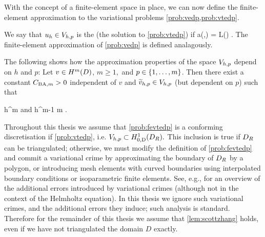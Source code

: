 

    With the concept of a finite-element space in place, we can now define the finite-element approximation to the variational problems \cref{prob:vedp,prob:vtedp}.

    \label{prob:fevtedp}
    We say that $u_{h} \in V_{h,p}$ is the  (the solution to \cref{prob:vtedp}) if
    \beqs
    a(\uh,\vh) = L(\vh) \tforall \vh \in \Vhp.
    \eeqs
    The finite-element approximation of \cref{prob:vedp} is defined analagously.
    \eprob

    The following  shows how the approximation properties of the space $V_{h,p}$ depend on $h$ and $p$:
    \label{lem:scottzhang}
    Let $v \in \HmD$, $m \geq 1,$ and $p \in \set{1,\ldots,m}$. Then there exist a constant $C_{\mathrm{BA},m}>0$ independent of $v$ and $\widetilde{v}_{h,p} \in V_{h,p}$ (but dependent on $p$) such that

    \beqs
{} \leq \CSZm h^m 
    \eeqs
     and
    \beqs
{} \leq \CSZm h^{m-1}  \tfor m .
    \eeqs
    \ele

    
    Throughout this thesis we assume that \cref{prob:fevtedp} is a conforming discretisation if \cref{prob:vtedp}, i.e. $\Vhp \subset \HozDDR.$ This inclusion is true if $D_{R}$ can be triangulated; otherwise, we must modify the definition of \cref{prob:fevtedp} and commit a variational crime by approximating the boundary of $D_{R}$ by a polygon, or introducing mesh elements with curved boundaries using interpolated boundary conditions or isoparametric finite elements. See, e.g., \cite[Chapter 10]{BrSc:08} for an overview of the additional errors introduced by variational crimes (although not in the context of the Helmholtz equation). In this thesis we  ignore such variational crimes, and the additional errors they induce; such analysis is standard. Therefore for the remainder of this thesis we assume that \cref{lem:scottzhang} holds, even if we have not triangulated the domain $D$ exactly.
    \ere
    

